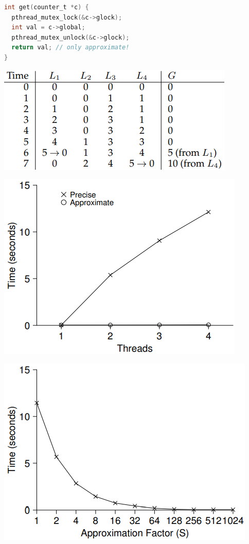 \begin{minipage}{.48\linewidth}
\begin{lstlisting}[language=c]
int get(counter_t *c) {
  pthread_mutex_lock(&c->glock);
  int val = c->global;
  pthread_mutex_unlock(&c->glock);
  return val; // only approximate!
}
\end{lstlisting}
\end{minipage}
\begin{minipage}{.52\linewidth}
  \centering
  \includegraphics[width=.85\linewidth]{imgs/tracing_approx_cnter}
\end{minipage}
\begin{minipage}{.5\linewidth}
  \includegraphics[width=.8\linewidth]{imgs/precise_approx_cnter}
\end{minipage}
\begin{minipage}{.5\linewidth}
  \centering
  \includegraphics[width=.8\linewidth]{imgs/scaling_approx_cnter}
\end{minipage}
